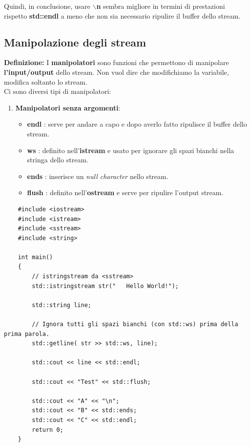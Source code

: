 \textsf{\small Quindi, in conclusione, usare \textbf{$\backslash$n} sembra migliore in termini di prestazioni rispetto \textbf{std::endl} a meno che non sia necessario ripulire il buffer dello stream.} \break

\subsection{Manipolazione degli stream}

\textsf{\small \textbf{Definizione: } I \textbf{manipolatori} sono funzioni che permettono di manipolare \textbf{l'input/output} dello stream. Non vuol dire che modifichiamo la variabile, modifica soltanto lo stream.} \\

\textsf{\small Ci sono diversi tipi di manipolatori: } \\

\begin{enumerate}
	\item \textsf{\small \textbf{Manipolatori senza argomenti}: }
	\begin{itemize}
		\item \textsf{\small \textbf{endl} : serve per andare a capo e dopo averlo fatto ripulisce il buffer dello stream.}
		\item \textsf{\small \textbf{ws} : definito nell'\textbf{istream} e usato per ignorare gli spazi bianchi nella stringa dello stream.}
		\item \textsf{\small \textbf{ends} : inserisce un \emph{null character} nello stream.}
		\item \textsf{\small \textbf{flush} : definito nell'\textbf{ostream} e serve per ripulire l'output stream.}
	\end{itemize}
\end{enumerate}

\begin{lstlisting}
	#include <iostream>
	#include <istream>
	#include <sstream>
	#include <string>
	
	int main()
	{
		// istringstream da <sstream>
		std::istringstream str("   Hello World!");
		
		std::string line;
		
		// Ignora tutti gli spazi bianchi (con std::ws) prima della prima parola.
		std::getline( str >> std::ws, line);
		
		std::cout << line << std::endl;
		
		std::cout << "Test" << std::flush;
		
		std::cout << "A" << "\n";
		std::cout << "B" << std::ends;
		std::cout << "C" << std::endl;
		return 0;
	}
\end{lstlisting}

